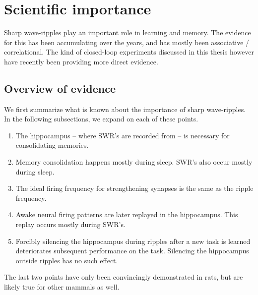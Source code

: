 \section{Scientific importance}
\label{sec:science}

Sharp wave-ripples play an important role in learning and memory.\footnotemark{} The evidence for this has been accumulating over the years, and has mostly been associative / correlational. The kind of closed-loop experiments discussed in this thesis however have recently been providing more direct evidence.





\subsection{Overview of evidence}

We first summarize what is known about the importance of sharp wave-ripples.
In the following subsections, we expand on each of these points.

\begin{enumerate}
\item The hippocampus -- where SWR's are recorded from -- is necessary for consolidating memories.
\item Memory consolidation happens mostly during sleep. SWR's also occur mostly during sleep.
\item The ideal firing frequency for strengthening synapses is the same as the ripple frequency.
\item Awake neural firing patterns are later replayed in the hippocampus. This replay occurs mostly during SWR's.
\item Forcibly silencing the hippocampus during ripples after a new task is learned deteriorates subsequent performance on the task. Silencing the hippocampus outside ripples has no such effect.
\end{enumerate}

The last two points have only been convincingly demonstrated in rats, but are likely true for other mammals as well.




